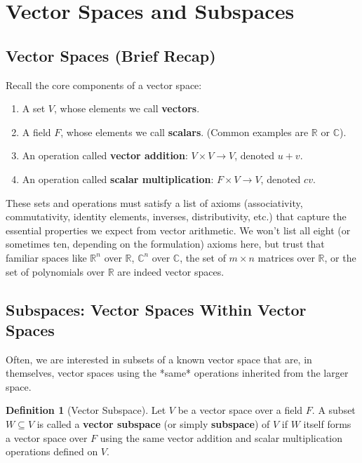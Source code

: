 \documentclass[11pt]{article}
\theoremstyle{definition}
\newtheorem{definition}[theorem]{Definition}
\theoremstyle{remark}
\begin{document}
\section{Vector Spaces and Subspaces}

\subsection{Vector Spaces (Brief Recap)}

Recall the core components of a vector space:
\begin{enumerate}
    \item A set $V$, whose elements we call \textbf{vectors}.
    \item A field $F$, whose elements we call \textbf{scalars}. (Common examples are $\mathbb{R}$ or $\mathbb{C}$).
    \item An operation called \textbf{vector addition}: $V \times V \to V$, denoted $u + v$.
    \item An operation called \textbf{scalar multiplication}: $F \times V \to V$, denoted $c v$.
\end{enumerate}
These sets and operations must satisfy a list of axioms (associativity, commutativity, identity elements, inverses, distributivity, etc.) that capture the essential properties we expect from vector arithmetic. We won't list all eight (or sometimes ten, depending on the formulation) axioms here, but trust that familiar spaces like $\mathbb{R}^n$ over $\mathbb{R}$, $\mathbb{C}^n$ over $\mathbb{C}$, the set of $m \times n$ matrices over $\mathbb{R}$, or the set of polynomials over $\mathbb{R}$ are indeed vector spaces.

\subsection{Subspaces: Vector Spaces Within Vector Spaces}

Often, we are interested in subsets of a known vector space that are, in themselves, vector spaces using the *same* operations inherited from the larger space.

\begin{definition}[Vector Subspace]
Let $V$ be a vector space over a field $F$. A subset $W \subseteq V$ is called a \textbf{vector subspace} (or simply \textbf{subspace}) of $V$ if $W$ itself forms a vector space over $F$ using the same vector addition and scalar multiplication operations defined on $V$.
\end{definition}
\end{document}
